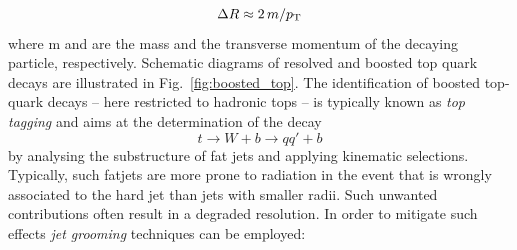\begin{equation}
 \Delta R \approx 2\,m /p_{\text{T}}
 \label{eq:rule-of-thumb}
\end{equation}  
where m and \pt are the mass and the transverse momentum of the decaying particle, respectively. Schematic diagrams of resolved and boosted top quark decays are illustrated in Fig.~\ref{fig:boosted_top}. The identification of boosted top-quark decays -- here restricted to hadronic tops -- is typically known as \textit{top tagging} and aims at the determination of the decay
\begin{equation}
 t \rightarrow W + b \rightarrow qq' + b 
\end{equation} 
by analysing the substructure of fat jets and applying kinematic selections. Typically, such fatjets are more prone to radiation in the event that is wrongly associated to the hard jet than jets with smaller radii. Such unwanted contributions often result in a degraded resolution. In order to mitigate such effects \textit{jet grooming} techniques can be employed:
